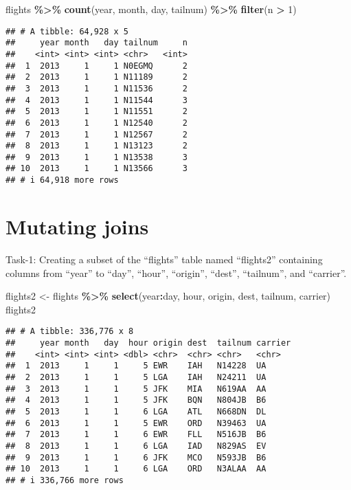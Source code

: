 \documentclass[
]{article}
\newenvironment{Shaded}{\begin{snugshade}}{\end{snugshade}}
\newcommand{\DecValTok}[1]{\textcolor[rgb]{0.00,0.00,0.81}{#1}}
\newcommand{\FunctionTok}[1]{\textcolor[rgb]{0.13,0.29,0.53}{\textbf{#1}}}
\newcommand{\NormalTok}[1]{#1}
\newcommand{\OtherTok}[1]{\textcolor[rgb]{0.56,0.35,0.01}{#1}}
\newcommand{\SpecialCharTok}[1]{\textcolor[rgb]{0.81,0.36,0.00}{\textbf{#1}}}
\begin{document}
\begin{Shaded}
\begin{Highlighting}[]
\NormalTok{flights }\SpecialCharTok{\%\textgreater{}\%} 
  \FunctionTok{count}\NormalTok{(year, month, day, tailnum) }\SpecialCharTok{\%\textgreater{}\%} 
  \FunctionTok{filter}\NormalTok{(n }\SpecialCharTok{\textgreater{}} \DecValTok{1}\NormalTok{)}
\end{Highlighting}
\end{Shaded}

\begin{verbatim}
## # A tibble: 64,928 x 5
##     year month   day tailnum     n
##    <int> <int> <int> <chr>   <int>
##  1  2013     1     1 N0EGMQ      2
##  2  2013     1     1 N11189      2
##  3  2013     1     1 N11536      2
##  4  2013     1     1 N11544      3
##  5  2013     1     1 N11551      2
##  6  2013     1     1 N12540      2
##  7  2013     1     1 N12567      2
##  8  2013     1     1 N13123      2
##  9  2013     1     1 N13538      3
## 10  2013     1     1 N13566      3
## # i 64,918 more rows
\end{verbatim}

\hypertarget{mutating-joins}{%
\section{Mutating joins}\label{mutating-joins}}

Task-1: Creating a subset of the ``flights'' table named ``flights2''
containing columns from ``year'' to ``day'', ``hour'', ``origin'',
``dest'', ``tailnum'', and ``carrier''.

\begin{Shaded}
\begin{Highlighting}[]
\NormalTok{flights2 }\OtherTok{\textless{}{-}}\NormalTok{ flights }\SpecialCharTok{\%\textgreater{}\%} 
  \FunctionTok{select}\NormalTok{(year}\SpecialCharTok{:}\NormalTok{day, hour, origin, dest, tailnum, carrier)}
\NormalTok{flights2}
\end{Highlighting}
\end{Shaded}

\begin{verbatim}
## # A tibble: 336,776 x 8
##     year month   day  hour origin dest  tailnum carrier
##    <int> <int> <int> <dbl> <chr>  <chr> <chr>   <chr>  
##  1  2013     1     1     5 EWR    IAH   N14228  UA     
##  2  2013     1     1     5 LGA    IAH   N24211  UA     
##  3  2013     1     1     5 JFK    MIA   N619AA  AA     
##  4  2013     1     1     5 JFK    BQN   N804JB  B6     
##  5  2013     1     1     6 LGA    ATL   N668DN  DL     
##  6  2013     1     1     5 EWR    ORD   N39463  UA     
##  7  2013     1     1     6 EWR    FLL   N516JB  B6     
##  8  2013     1     1     6 LGA    IAD   N829AS  EV     
##  9  2013     1     1     6 JFK    MCO   N593JB  B6     
## 10  2013     1     1     6 LGA    ORD   N3ALAA  AA     
## # i 336,766 more rows
\end{verbatim}
\end{document}
